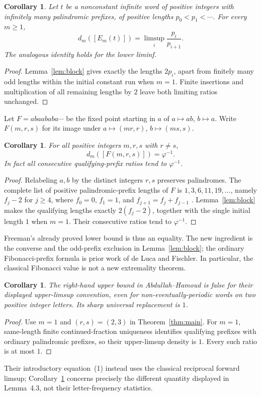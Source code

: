 \documentclass[11pt]{article}
\newtheorem{corollary}[theorem]{Corollary}
\begin{document}
\begin{corollary}\label{cor:transport}
Let $t$ be a nonconstant infinite word of positive integers with infinitely
many palindromic prefixes, of positive lengths $p_0<p_1<\cdots$.
For every $m\geq1$,
\[
 d_m([E_m(t)])=\limsup_i\frac{p_i}{p_{i+1}}.
\]
The analogous identity holds for the lower liminf.
\end{corollary}
\begin{proof}
Lemma~\ref{lem:block} gives exactly the lengths $2p_i$, apart from finitely
many odd lengths within the initial constant run when $m=1$.
Finite insertions and multiplication of all remaining lengths by $2$
leave both limiting ratios unchanged.
\end{proof}

Let $F=abaababa\cdots$ be the fixed point starting in $a$ of
$a\mapsto ab$, $b\mapsto a$. Write $F(m,r,s)$ for its image under
$a\mapsto(mr,r)$, $b\mapsto(ms,s)$.

\begin{corollary}\label{cor:fibonacci}
For all positive integers $m,r,s$ with $r\ne s$,
\[
 d_m([F(m,r,s)])=\varphi^{-1}.
\]
In fact all consecutive qualifying-prefix ratios tend to $\varphi^{-1}$.
\end{corollary}
\begin{proof}
Relabeling $a,b$ by the distinct integers $r,s$ preserves palindromes.
The complete list of positive palindromic-prefix lengths of $F$ is
$1,3,6,11,19,\ldots$, namely $f_j-2$ for $j\geq4$, where
$f_0=0$, $f_1=1$, and $f_{j+1}=f_j+f_{j-1}$
\cite[\S1, p.~1; attributed there to de Luca (1997), Theorem~5]{Fischler}.
Lemma~\ref{lem:block} makes the qualifying
lengths exactly $2(f_j-2)$, together with the single initial length $1$
when $m=1$. Their consecutive ratios tend to $\varphi^{-1}$.
\end{proof}

Freeman's already proved lower bound \cite[\S7, p.~9]{Freeman} is thus
an equality. The new ingredient is the converse and the odd-prefix exclusion
in Lemma~\ref{lem:block}; the ordinary Fibonacci-prefix formula is prior
work of de Luca and Fischler. In particular, the classical
Fibonacci value is not a new extremality theorem.

\begin{corollary}\label{cor:later}
The right-hand upper bound in Abdullah--Hamoud
\cite[Lemma~4.3, equation~(7), pp.~7--8]{AH} is false for their displayed
upper-limsup convention, even for non-eventually-periodic words on two
positive integer letters. Its sharp universal replacement is $1$.
\end{corollary}
\begin{proof}
Use $m=1$ and $(r,s)=(2,3)$ in Theorem~\ref{thm:main}.
For $m=1$, same-length finite continued-fraction uniqueness identifies
qualifying prefixes with ordinary palindromic prefixes, so their
upper-limsup density is $1$. Every such ratio is at most $1$.
\end{proof}
Their introductory equation~(1) instead uses the classical reciprocal
forward limsup; Corollary~\ref{cor:later} concerns precisely the different
quantity displayed in Lemma~4.3, not their letter-frequency statistics.
\end{document}
